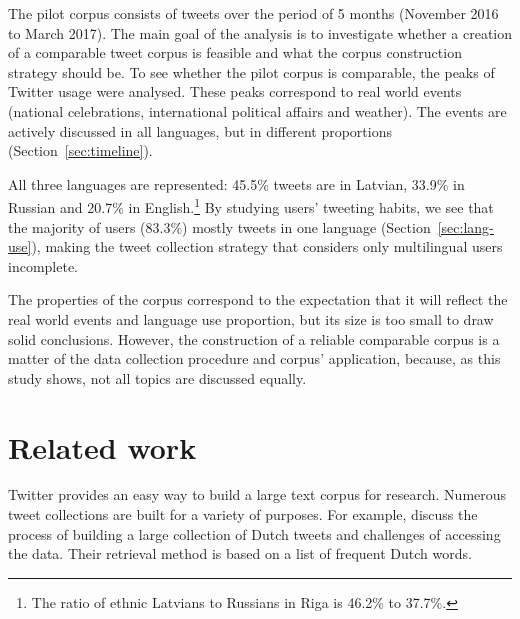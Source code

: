 \documentclass[11pt,a4paper]{article}
\begin{document}
The pilot corpus\footnotemark{} consists of tweets over the period of 5 months (November 2016 to March 2017). The main goal of the analysis is to investigate whether a creation of a comparable tweet corpus is feasible and what the corpus construction strategy should be. To see whether the pilot corpus is comparable, the peaks of Twitter usage were analysed. These peaks correspond to real world events (national celebrations, international political affairs and weather). The events are actively discussed in all languages, but in different proportions (Section~\ref{sec:timeline}).


All three languages are represented: 45.5\% tweets are in Latvian, 33.9\% in Russian and 20.7\% in English.\footnote{
The ratio of ethnic Latvians to Russians in Riga is 46.2\% to 37.7\%.}
By studying users' tweeting habits, we see that the majority of users (83.3\%) mostly tweets in one language (Section~\ref{sec:lang-use}), making the tweet collection strategy that considers only multilingual users incomplete.

The properties of the corpus correspond to the expectation that it will reflect the real world events and language use proportion, but its size is too small to draw solid conclusions. However, the construction of a reliable comparable corpus is a matter of the data collection procedure and corpus' application, because, as this study shows, not all topics are discussed equally.


\section{Related work}

Twitter %
provides an easy way to build a large text corpus for research. Numerous tweet collections are built for a variety of purposes. For example, \citet{sang2013} discuss the process of building a large collection of Dutch tweets and challenges of accessing the data. %
Their retrieval method is based on a list of frequent Dutch words.
\end{document}
